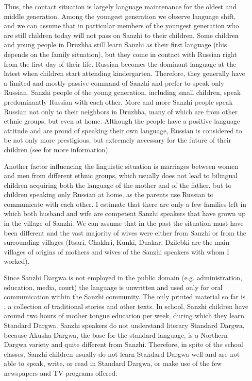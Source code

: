 Thus, the contact situation is largely language maintenance for the oldest and middle generation. Among the youngest generation we observe language shift, and we can assume that in particular members of the youngest generation who are still children today will not pass on Sanzhi to their children. Some children and young people in Druzhba still learn Sanzhi as their first language (this depends on the family situation), but they come in contact with Russian right from the first day of their life. Russian becomes the dominant language at the latest when children start attending kindergarten. Therefore, they generally have a limited and mostly passive command of Sanzhi and prefer to speak only Russian. Sanzhi people of the young generation, including small children, speak predominantly Russian with each other. More and more Sanzhi people speak Russian not only to their neighbors in Druzhba, many of which are from other ethnic groups, but even at home. Although the people have a positive language attitude and are proud of speaking their own language, Russian is considered to be not only more prestigious, but extremely necessary for the future of their children (see \citet{ForkerSubmitteda} for more information).

Another factor influencing the linguistic situation is marriages between women and men from different ethnic groups, which usually does not lead to bilingual children acquiring both the language of the mother and of the father, but to children speaking only Russian at home, as the parents use Russian to communicate with each other. I estimate that there are only a few families left in which both husband and wife are competent Sanzhi speakers that have grown up in the village of Sanzhi. We can assume that in the past the situation must have been different and the vast majority of wives were either from Sanzhi or from the surrounding villages (Itsari, Chakhri, Kunki, Duakar, Dzilebki are the main villages of origins of mothers and wives of the Sanzhi speakers with whom I worked).

Since Sanzhi Dargwa is not employed in the public domain (e.g. administration, education, media,  court) the language is unwritten and used only for oral communication within the Sanzhi community. The only printed material so far is \citet{Forker.Gadzhimuradov2017}, a collection of traditional stories and other texts. In school, Sanzhi children have around two hours of mother tongue education per week, during which they learn Standard Dargwa. Sanzhi speakers do not understand literary Standard Dargwa, because Akusha Dargwa, the base for the standard language, is a Northern Dargwa variety and quite different from Sanzhi. Therefore, in spite of the school classes, Sanzhi children usually do not learn Standard Dargwa well and are not able to speak, write, or read in Standard Dargwa, or make use of the few newspapers and TV programs offered.




